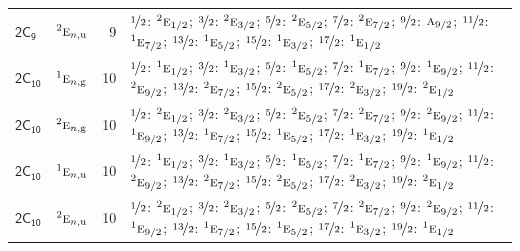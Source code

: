 \documentclass[10pt,a4paper]{article}
\numberwithin{equation}{section}
\newcommand{\grp}[1]{\mathsf{#1}}
\newcommand{\irr}[1]{\text{\normalfont\scshape #1}}
\newcommand{\conjpair}[1]{{}^{#1}}
\newcommand{\ptag}[1]{\mathrm{#1}}
\newlength{\fillwidth}\newlength{\cellwidth}\newlength{\colwidth}
\begin{document}
{\begin{longtable}{@{}llr>{\RaggedRight\arraybackslash}p{\fillwidth}@{}}
\href{2C9.pdf}{$\grp{2C_{9}}$} & $\conjpair{2}\irr{e}_{n,\ptag{u}}$ & 9 & $\nicefrac{1}{2}$: $\conjpair{2}\irr{e}_{1/2}$; $\nicefrac{3}{2}$: $\conjpair{2}\irr{e}_{3/2}$; $\nicefrac{5}{2}$: $\conjpair{2}\irr{e}_{5/2}$; $\nicefrac{7}{2}$: $\conjpair{2}\irr{e}_{7/2}$; $\nicefrac{9}{2}$: $\irr{a}_{9/2}$; $\nicefrac{11}{2}$: $\conjpair{1}\irr{e}_{7/2}$; $\nicefrac{13}{2}$: $\conjpair{1}\irr{e}_{5/2}$; $\nicefrac{15}{2}$: $\conjpair{1}\irr{e}_{3/2}$; $\nicefrac{17}{2}$: $\conjpair{1}\irr{e}_{1/2}$\\
\href{2C10.pdf}{$\grp{2C_{10}}$} & $\conjpair{1}\irr{e}_{n,\ptag{g}}$ & 10 & $\nicefrac{1}{2}$: $\conjpair{1}\irr{e}_{1/2}$; $\nicefrac{3}{2}$: $\conjpair{1}\irr{e}_{3/2}$; $\nicefrac{5}{2}$: $\conjpair{1}\irr{e}_{5/2}$; $\nicefrac{7}{2}$: $\conjpair{1}\irr{e}_{7/2}$; $\nicefrac{9}{2}$: $\conjpair{1}\irr{e}_{9/2}$; $\nicefrac{11}{2}$: $\conjpair{2}\irr{e}_{9/2}$; $\nicefrac{13}{2}$: $\conjpair{2}\irr{e}_{7/2}$; $\nicefrac{15}{2}$: $\conjpair{2}\irr{e}_{5/2}$; $\nicefrac{17}{2}$: $\conjpair{2}\irr{e}_{3/2}$; $\nicefrac{19}{2}$: $\conjpair{2}\irr{e}_{1/2}$\\
\href{2C10.pdf}{$\grp{2C_{10}}$} & $\conjpair{2}\irr{e}_{n,\ptag{g}}$ & 10 & $\nicefrac{1}{2}$: $\conjpair{2}\irr{e}_{1/2}$; $\nicefrac{3}{2}$: $\conjpair{2}\irr{e}_{3/2}$; $\nicefrac{5}{2}$: $\conjpair{2}\irr{e}_{5/2}$; $\nicefrac{7}{2}$: $\conjpair{2}\irr{e}_{7/2}$; $\nicefrac{9}{2}$: $\conjpair{2}\irr{e}_{9/2}$; $\nicefrac{11}{2}$: $\conjpair{1}\irr{e}_{9/2}$; $\nicefrac{13}{2}$: $\conjpair{1}\irr{e}_{7/2}$; $\nicefrac{15}{2}$: $\conjpair{1}\irr{e}_{5/2}$; $\nicefrac{17}{2}$: $\conjpair{1}\irr{e}_{3/2}$; $\nicefrac{19}{2}$: $\conjpair{1}\irr{e}_{1/2}$\\
\href{2C10.pdf}{$\grp{2C_{10}}$} & $\conjpair{1}\irr{e}_{n,\ptag{u}}$ & 10 & $\nicefrac{1}{2}$: $\conjpair{1}\irr{e}_{1/2}$; $\nicefrac{3}{2}$: $\conjpair{1}\irr{e}_{3/2}$; $\nicefrac{5}{2}$: $\conjpair{1}\irr{e}_{5/2}$; $\nicefrac{7}{2}$: $\conjpair{1}\irr{e}_{7/2}$; $\nicefrac{9}{2}$: $\conjpair{1}\irr{e}_{9/2}$; $\nicefrac{11}{2}$: $\conjpair{2}\irr{e}_{9/2}$; $\nicefrac{13}{2}$: $\conjpair{2}\irr{e}_{7/2}$; $\nicefrac{15}{2}$: $\conjpair{2}\irr{e}_{5/2}$; $\nicefrac{17}{2}$: $\conjpair{2}\irr{e}_{3/2}$; $\nicefrac{19}{2}$: $\conjpair{2}\irr{e}_{1/2}$\\
\href{2C10.pdf}{$\grp{2C_{10}}$} & $\conjpair{2}\irr{e}_{n,\ptag{u}}$ & 10 & $\nicefrac{1}{2}$: $\conjpair{2}\irr{e}_{1/2}$; $\nicefrac{3}{2}$: $\conjpair{2}\irr{e}_{3/2}$; $\nicefrac{5}{2}$: $\conjpair{2}\irr{e}_{5/2}$; $\nicefrac{7}{2}$: $\conjpair{2}\irr{e}_{7/2}$; $\nicefrac{9}{2}$: $\conjpair{2}\irr{e}_{9/2}$; $\nicefrac{11}{2}$: $\conjpair{1}\irr{e}_{9/2}$; $\nicefrac{13}{2}$: $\conjpair{1}\irr{e}_{7/2}$; $\nicefrac{15}{2}$: $\conjpair{1}\irr{e}_{5/2}$; $\nicefrac{17}{2}$: $\conjpair{1}\irr{e}_{3/2}$; $\nicefrac{19}{2}$: $\conjpair{1}\irr{e}_{1/2}$\\

\end{longtable}}
\end{document}
